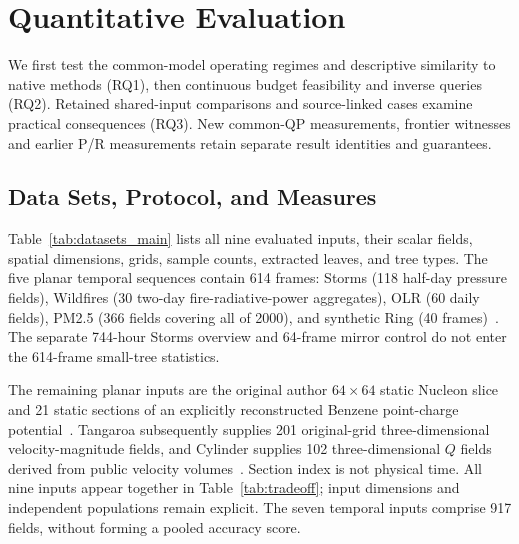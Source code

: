 \section{Quantitative Evaluation}\label{sec:eval}
We first test the common-model operating regimes and descriptive similarity to native methods (RQ1), then continuous budget feasibility and inverse queries (RQ2). Retained shared-input comparisons and source-linked cases examine practical consequences (RQ3). New common-QP measurements, frontier witnesses and earlier P/R measurements retain separate result identities and guarantees.

\subsection{Data Sets, Protocol, and Measures}
Table~\ref{tab:datasets_main} lists all nine evaluated inputs, their scalar fields, spatial dimensions, grids, sample counts, extracted leaves, and tree types. The five planar temporal sequences contain 614 frames: Storms (118 half-day pressure fields), Wildfires (30 two-day fire-radiative-power aggregates), OLR (60 daily fields), PM2.5 (366 fields covering all of 2000), and synthetic Ring (40 frames)~\cite{Hersbach:2020:ERA5,Franke:2021:1DP,NOAA:OLR,Dong:2026:PM25,Koepp:2023:TMTM}. The separate 744-hour Storms overview and 64-frame mirror control do not enter the 614-frame small-tree statistics.

The remaining planar inputs are the original author $64\times64$ static Nucleon slice and 21 static sections of an explicitly reconstructed Benzene point-charge potential~\cite{Koepp:2023:TMTM,Jorgensen:2013:BOSS,Inviwo:BenzeneGeometry}. Tangaroa subsequently supplies 201 original-grid three-dimensional velocity-magnitude fields, and Cylinder supplies 102 three-dimensional $Q$ fields derived from public velocity volumes~\cite{Popinet:2004:Tangaroa,Camarri:2005:Cylinder,Weinkauf:SquareCylinder}. Section index is not physical time. All nine inputs appear together in Table~\ref{tab:tradeoff}; input dimensions and independent populations remain explicit. The seven temporal inputs comprise 917 fields, without forming a pooled accuracy score.

